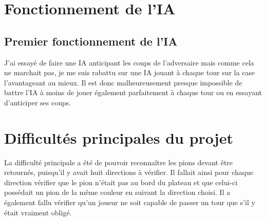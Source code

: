 \documentclass{report}
\begin{document}
\chapter{Fonctionnement de l'IA}
\section{Premier fonctionnement de l'IA}
J'ai essayé de faire une IA anticipant les coups de l'adversaire mais comme cela ne marchait pas, je me suis rabattu sur une IA jouant à chaque tour sur la case l'avantageant au mieux. Il est donc malheureusement presque impossible de battre l'IA à moins de jouer également parfaitement à chaque tour ou en essayant d'anticiper ses coups.

\chapter{Difficultés principales du projet}
La difficulté principale a été de pouvoir reconnaître les pions devant être retournés, puisqu'il y avait huit directions à vérifier. Il fallait ainsi pour chaque direction vérifier que le pion n'était pas au bord du plateau et que celui-ci possédait un pion de la même couleur en suivant la direction choisi. Il a également fallu vérifier qu'un joueur ne soit capable de passer un tour que s'il y était vraiment obligé.
\end{document}
